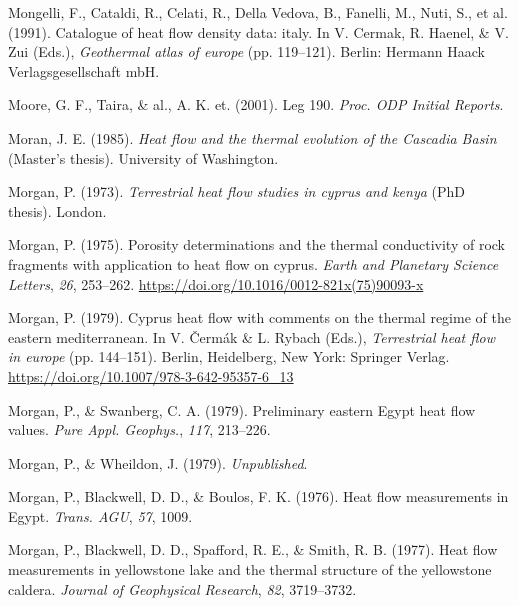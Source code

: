 \documentclass[draft,linenumbers]{agujournal2018}
\begin{document}
\leavevmode{}%
Mongelli, F., Cataldi, R., Celati, R., Della Vedova, B., Fanelli, M.,
Nuti, S., et al. (1991). Catalogue of heat flow density data: italy. In
V. Cermak, R. Haenel, \& V. Zui (Eds.), \emph{Geothermal atlas of
europe} (pp. 119--121). Berlin: Hermann Haack Verlagsgesellschaft mbH.

\leavevmode{}%
Moore, G. F., Taira, \& al., A. K. et. (2001). Leg 190. \emph{Proc. ODP
Initial Reports}.

\leavevmode{}%
Moran, J. E. (1985). \emph{Heat flow and the thermal evolution of the
{Cascadia Basin}} (Master's thesis). University of Washington.

\leavevmode{}%
Morgan, P. (1973). \emph{Terrestrial heat flow studies in cyprus and
kenya} (PhD thesis). London.

\leavevmode{}%
Morgan, P. (1975). Porosity determinations and the thermal conductivity
of rock fragments with application to heat flow on cyprus. \emph{Earth
and Planetary Science Letters}, \emph{26}, 253--262.
\url{https://doi.org/10.1016/0012-821x(75)90093-x}

\leavevmode{}%
Morgan, P. (1979). Cyprus heat flow with comments on the thermal regime
of the eastern mediterranean. In V. Čermák \& L. Rybach (Eds.),
\emph{Terrestrial heat flow in europe} (pp. 144--151). Berlin,
Heidelberg, New York: Springer Verlag.
\url{https://doi.org/10.1007/978-3-642-95357-6_13}

\leavevmode{}%
Morgan, P., \& Swanberg, C. A. (1979). Preliminary eastern {Egypt} heat
flow values. \emph{Pure Appl. Geophys.}, \emph{117}, 213--226.

\leavevmode{}%
Morgan, P., \& Wheildon, J. (1979). \emph{Unpublished}.

\leavevmode{}%
Morgan, P., Blackwell, D. D., \& Boulos, F. K. (1976). Heat flow
measurements in {Egypt}. \emph{Trans. AGU}, \emph{57}, 1009.

\leavevmode{}%
Morgan, P., Blackwell, D. D., Spafford, R. E., \& Smith, R. B. (1977).
Heat flow measurements in yellowstone lake and the thermal structure of
the yellowstone caldera. \emph{Journal of Geophysical Research},
\emph{82}, 3719--3732.
\end{document}
